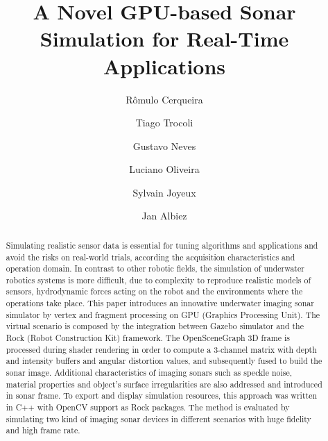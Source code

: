 \documentclass[final,5p,times]{elsarticle}
\begin{document}
\begin{frontmatter}



\title{A Novel GPU-based Sonar Simulation for Real-Time Applications}

\author[senai,ufba]{Rômulo Cerqueira} 
\author[senai]{Tiago Trocoli}
\author[senai]{Gustavo Neves}
\author[ufba]{Luciano Oliveira}
\author[senai]{Sylvain Joyeux}
\author[senai,dfki]{Jan Albiez}

\address[senai]{Brazilian Institute of Robotics, SENAI CIMATEC, Salvador, Bahia, Brazil}
\address[ufba]{Intelligent Vision Research Lab, Federal University of Bahia, Salvador, Bahia, Brazil}
\address[dfki]{Robotics Innovation Center, DFKI GmbH, Bremen, Germany}

\begin{abstract}

Simulating realistic sensor data is essential for tuning algorithms and applications and avoid the risks on real-world trials, according the acquisition characteristics and operation domain. In contrast to other robotic fields, the simulation of underwater robotics systems is more difficult, due to complexity to reproduce realistic models of sensors, hydrodynamic forces acting on the robot and the environments where the operations take place. This paper introduces an innovative underwater imaging sonar simulator by vertex and fragment processing on GPU (Graphics Processing Unit). The virtual scenario is composed by the integration between Gazebo simulator and the Rock (Robot Construction Kit) framework. The OpenSceneGraph 3D frame is processed during shader rendering in order to compute a 3-channel matrix with depth and intensity buffers and angular distortion values, and subsequently fused to build the sonar image. Additional characteristics of imaging sonars such as speckle noise, material properties and object's surface irregularities are also addressed and introduced in sonar frame. To export and display simulation resources, this approach was written in C++ with OpenCV support as Rock packages. The method is evaluated by simulating two kind of imaging sonar devices in different scenarios with huge fidelity and high frame rate.


\end{abstract}
\end{frontmatter}
\end{document}
